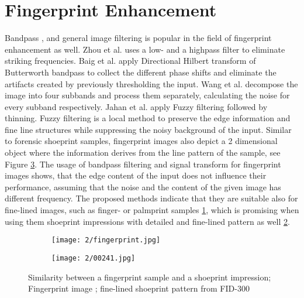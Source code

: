 \documentclass[draft,final]{vutinfth} %
\begin{document}
\section*{Fingerprint Enhancement}
\par
Bandpass \cite{zhou2011adaptive}, \cite{baig2015enhancement} and general image filtering  \cite{jahan2017robust} is popular in the field of fingerprint enhancement as well.
Zhou et al. \cite{zhou2011adaptive} uses a low- and a highpass filter to eliminate striking frequencies. 
Baig et al. \cite{baig2015enhancement} apply Directional Hilbert transform of Butterworth bandpass to collect the different phase shifts and eliminate the artifacts created by previously thresholding the input.
Wang et al. \cite{wang2014enhanced} decompose the image into four subbands and process them separately, calculating the noise for every subband respectively.
Jahan et al. \cite{jahan2017robust} apply Fuzzy filtering followed by thinning.
Fuzzy filtering is a local method to preserve the edge information and fine line structures while suppressing the noisy background of the input.
Similar to forensic shoeprint samples, fingerprint images also depict a 2 dimensional object where the information derives from the line pattern of the sample, see Figure \ref{fig:rw:fingerprint}.
The usage of bandpass filtering and signal transform for fingerprint images shows, that the edge content of the input does not influence their performance, assuming that the noise and the content of the given image has different frequency.
The proposed methods indicate that they are suitable also for fine-lined images, such as finger- or palmprint samples \ref{fig:rw:fp}, which is promising when using them shoeprint impressions with detailed and fine-lined pattern as well \ref{fig:rw:ref}. 

\begin{figure}[h]
  \centering
  \begin{subfigure}[t]{0.4\columnwidth}
    \centering
    \texttt{[image: 2/fingerprint.jpg]}
    \subcaption{}
    \label{fig:rw:fp}
  \end{subfigure}
  \begin{subfigure}[t]{0.4\columnwidth}
    \centering
    \texttt{[image: 2/00241.jpg]}
    \subcaption{}
    \label{fig:rw:ref}
  \end{subfigure}
  \caption{Similarity between a fingerprint sample and a shoeprint  impression;
		 Fingerprint image \cite{van2016fingerprint};  fine-lined shoeprint pattern from FID-300  \cite{kortylewski2014unsupervised}}
  \label{fig:rw:fingerprint} %
\end{figure}
\end{document}
